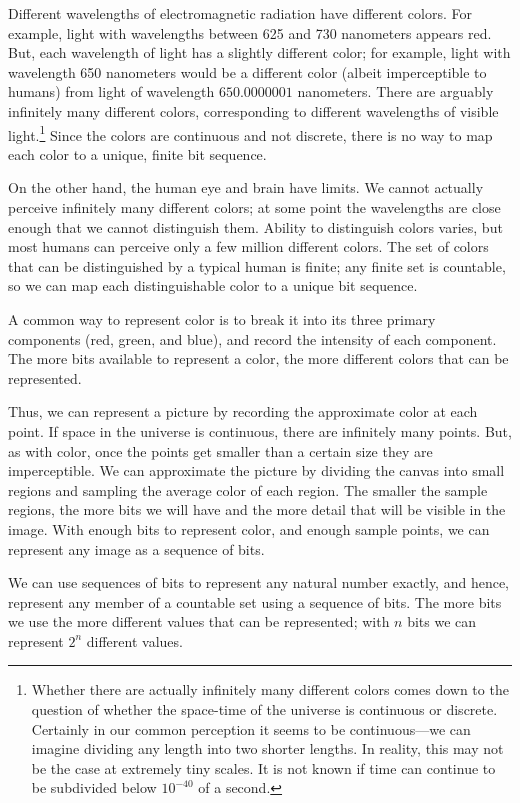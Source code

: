 Different wavelengths of electromagnetic radiation have different colors.  For example, light with wavelengths between 625 and 730 nanometers appears red.  But, each wavelength of light has a slightly different color; for example, light with wavelength 650 nanometers would be a different color (albeit imperceptible to humans) from light of wavelength $650.0000001$ nanometers.  There are arguably infinitely many different colors, corresponding to different wavelengths of visible light.\footnote{Whether there are actually infinitely many different colors comes down to the question of whether the space-time of the universe is continuous or discrete.  Certainly in our common perception it seems to be continuous---we can imagine dividing any length into two shorter lengths.  In reality, this may not be the case at extremely tiny scales.  It is not known if time can continue to be subdivided below $10^{-40}$ of a second.}  Since the colors are continuous and not discrete, there is no way to map each color to a unique, finite bit sequence.

On the other hand, the human eye and brain have limits.  We cannot actually perceive infinitely many different colors; at some point the wavelengths are close enough that we cannot distinguish them.  Ability to distinguish colors varies, but most humans can perceive only a few million different colors.  The set of colors that can be distinguished by a typical human is finite; any finite set is countable, so we can map each distinguishable color to a unique bit sequence.  

A common way to represent color is to break it into its three primary components (red, green, and blue), and record the intensity of each component.  The more bits available to represent a color, the more different colors that can be represented.  

Thus, we can represent a picture by recording the approximate color at each point.  If space in the universe is continuous, there are infinitely many points.  But, as with color, once the points get smaller than a certain size they are imperceptible.  We can approximate the picture by dividing the canvas into small regions and sampling the average color of each region.  The smaller the sample regions, the more bits we will have and the more detail that will be visible in the image.  With enough bits to represent color, and enough sample points, we can represent any image as a sequence of bits.  

  We can use sequences of bits to represent any natural number exactly, and hence, represent any member of a countable set using a sequence of bits.  The more bits we use the more different values that can be represented; with $n$ bits we can represent $2^{n}$ different values.  

